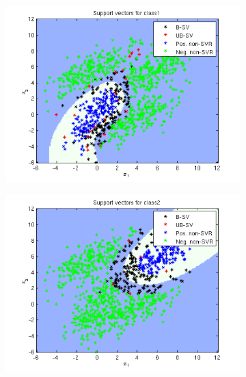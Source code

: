 \documentclass{article}
\begin{document}
\begin{figure}
\begin{subfigure}{.5\textwidth}
  \centering
  \includegraphics[width=.8\linewidth]{Classification/1c/nu_g/sv1}
 
\end{subfigure}%
\begin{subfigure}{.5\textwidth}
  \centering
  \includegraphics[width=.8\linewidth]{Classification/1c/nu_g/sv2}
  
\end{subfigure}
\end{figure}
\end{document}
